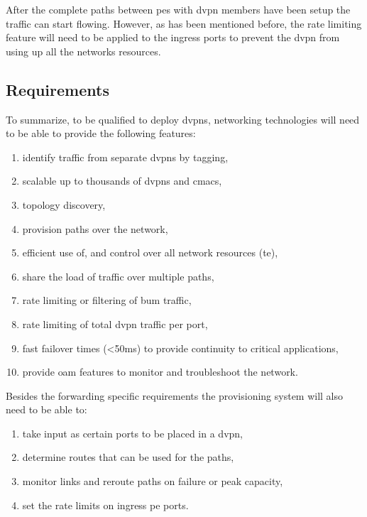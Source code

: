After the complete paths between \acp{pe} with \ac{dvpn} members have been setup the traffic can start flowing. However, as has been mentioned before, the rate limiting feature will need to be applied to the ingress ports to prevent the \ac{dvpn} from using up all the networks resources. 



\subsection{Requirements} %
\label{sub:requirements}


To summarize, to be qualified to deploy \acp{dvpn}, networking technologies will need to be able to provide the following features:

\begin{enumerate}
	\item identify traffic from separate \acp{dvpn} by tagging, 
	\item scalable up to thousands of \acp{dvpn} and \acsp{cmac},
	\item topology discovery, 
	\item provision paths over the network,
	\item efficient use of, and control over all network resources (\ac{te}),
	\item share the load of traffic over multiple paths,
	\item rate limiting or filtering of \ac{bum} traffic,
	\item rate limiting of total \ac{dvpn} traffic per port,
	\item fast failover times (<50ms) to provide continuity to critical applications,
	\item provide \acl{oam} features to monitor and troubleshoot the network.
\end{enumerate}

Besides the forwarding specific requirements the provisioning system will also need to be able to:

\begin{enumerate}
	\item take input as certain ports to be placed in a \ac{dvpn},
	\item determine routes that can be used for the paths,
	\item monitor links and reroute paths on failure or peak capacity,
	\item set the rate limits on ingress \ac{pe} ports.
\end{enumerate}


